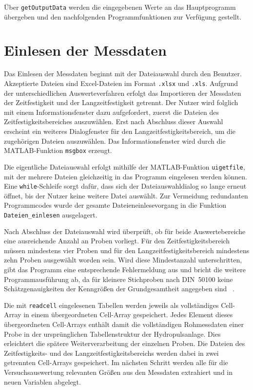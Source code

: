 	Über \texttt{getOutputData} werden die eingegebenen Werte an das Hauptprogramm übergeben und den nachfolgenden Programmfunktionen zur Verfügung gestellt. 

	\section{Einlesen der Messdaten}
	Das Einlesen der Messdaten beginnt mit der Dateiauswahl durch den Benutzer. Akzeptierte Dateien sind Excel-Dateien im Format \texttt{.xlsx} und \texttt{.xls}. Aufgrund der unterschiedlichen Auswerteverfahren erfolgt das Importieren der Messdaten der Zeitfestigkeit und der Langzeitfestigkeit getrennt. Der Nutzer wird folglich mit einem Informationsfenster dazu aufgefordert, zuerst die Dateien des Zeitfestigkeitsbereiches auszuwählen. Erst nach Abschluss dieser Auswahl erscheint ein weiteres Dialogfenster für den Langzeitfestigkeitsbereich, um die zugehörigen Dateien auszuwählen. 
 Das Informationsfenster wird durch die MATLAB-Funktion \texttt{msgbox} erzeugt. 
 
 Die eigentliche Dateiauswahl erfolgt mithilfe der MATLAB-Funktion \texttt{uigetfile}, mit der mehrere Dateien gleichzeitig in das Programm eingelesen werden können. Eine \texttt{while}-Schleife sorgt dafür, dass sich der Dateiauswahldialog so lange erneut öffnet, bis der Nutzer keine weitere Datei auswählt. Zur Vermeidung redundanten Programmcodes wurde der gesamte Dateieneinlesevorgang in die Funktion \texttt{Dateien\_einlesen} ausgelagert.
 
 Nach Abschluss der Dateiauswahl wird überprüft, ob für beide Auswertebereiche eine ausreichende Anzahl an Proben vorliegt. Für den Zeitfestigkeitsbereich müssen mindestens vier Proben und für den Langzeitfestigkeitsbereich mindestens zehn Proben ausgewählt worden sein. Wird diese Mindestanzahl unterschritten, gibt das Programm eine entsprechende Fehlermeldung aus und bricht die weitere Programmausführung ab, da für kleinere Stichproben nach DIN~50100 keine Schätzgenauigkeiten der Kenngrößen der Grundgesamtheit angegeben sind~\cite[Seite~30--35 und Seite~68--69]{DIN50100} .
 
 Die mit \texttt{readcell} eingelesenen Tabellen werden jeweils als vollständiges Cell-Array in einem übergeordneten Cell-Array gespeichert. Jedes Element dieses übergeordneten Cell-Arrays enthält damit die vollständigen Rohmessdaten einer Probe in der ursprünglichen Tabellenstruktur der Hydropulsanlage. Dies erleichtert die spätere Weiterverarbeitung der einzelnen Proben. Die Dateien des Zeitfestigkeits- und des Langzeitfestigkeitsbereichs werden dabei in zwei getrennten Cell-Arrays gespeichert. Im nächsten Schritt werden alle für die Versuchsauswertung relevanten Größen aus den Messdaten extrahiert und in neuen Variablen abgelegt.



